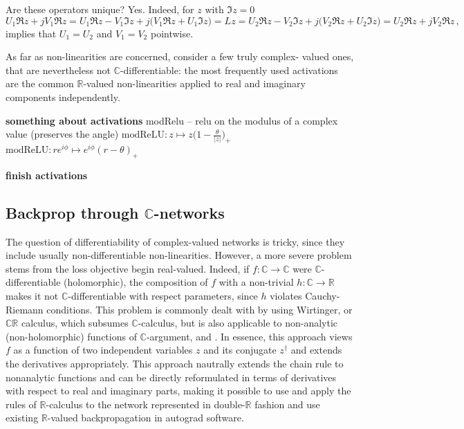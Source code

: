 \documentclass[a4paper,10pt]{article}
\newcommand{\important}[1]{\textbf{\color{red} #1}}
\newcommand{\todo}{\important}  %
\newcommand{\real}{\mathbb{R}}
\newcommand{\hop}{\dagger}
\newcommand{\cplx}{\mathbb{C}}
\begin{document}
Are these operators unique? Yes. Indeed, for $z$ with $\Im z = 0$ 
$$
U_1 \Re z + j V_1 \Re z
  = U_1 \Re z - V_1 \Im z + j \bigl( V_1 \Re z + U_1 \Im z \bigr)
  = L z
  = U_2 \Re z - V_2 \Im z + j \bigl( V_2 \Re z + U_2 \Im z \bigr)
  = U_2 \Re z + j V_2 \Re z
  \,, $$
implies that $U_1 = U_2$ and $V_1 = V_2$ pointwise.

As far as non-linearities are concerned, \cite{trabelsi_deep_2017} consider a few truly complex-%
valued ones, that are nevertheless not $\cplx$-differentiable: the most frequently used activations are the common $\real$-valued non-linearities applied to real and
imaginary components independently.

\todo{something about activations}
modRelu -- relu on the modulus of a complex value (preserves the angle)
$
\mathrm{modReLU}
  \colon z \mapsto z \bigl(
    1 - \tfrac\theta{\lvert z \rvert}
  \bigr)_+
$
$
\mathrm{modReLU}
  \colon r e^{i \phi} \mapsto e^{i \phi} (r - \theta)_+
$

\todo{finish activations}

\subsection{Backprop through $\cplx$-networks} %
\label{sub:backprop_through_c_networks}

The question of differentiability of complex-valued networks is tricky, since they include
usually non-differentiable non-linearities. However, a more severe problem stems from the loss
objective begin real-valued. Indeed, if $f\colon \cplx \to \cplx$ were $\cplx$-differentiable
(holomorphic), the composition of $f$ with a non-trivial $h \colon \cplx\to \real$ makes it
not $\cplx$-differentiable with respect parameters, since $h$ violates Cauchy-Riemann conditions.
This problem is commonly dealt with by using Wirtinger, or $\cplx\real$ calculus, which subsumes
$\cplx$-calculus, but is also applicable to non-analytic (non-holomorphic) functions of
$\cplx$-argument, \cite{adali_complex-valued_2011} and \cite{trabelsi_deep_2017}. In essence,
this approach views $f$ as a function of two independent variables $z$ and its conjugate $z^\hop$
and extends the derivatives appropriately. This approach nautrally extends the chain rule to
nonanalytic functions and can be directly reformulated in terms of derivatives with respect
to real and imaginary parts, making it possible to use and apply the rules of $\real$-calculus
to the network represented in double-$\real$ fashion and use existing $\real$-valued
backpropagation in autograd software.
\end{document}
